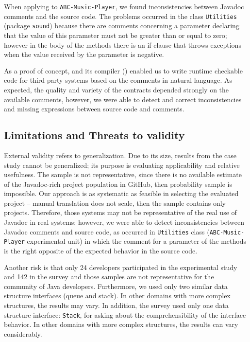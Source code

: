 When applying \contractjdoc{} to \texttt{ABC-Music-Player}, we found inconsistencies between Javadoc comments and the source code. The problems occurred in the class \texttt{Utilities} (package
\texttt{sound}) because there are comments concerning a parameter declaring that the value of
this parameter must not be greater than or equal to zero; however in the body of the methods there
is an if-clause that throws exceptions when the value received by the parameter is negative.

As a proof of concept, \contractjdoc{} and its compiler (\contractjdocCompiler{}) enabled us to write runtime
checkable code for third-party systems based on the comments in natural
language.
As expected, the quality and variety of the contracts depended strongly on the available comments, however, we were able to
detect and correct inconsistencies and missing expressions between source code and comments.




\subsection{Limitations and Threats to validity}
\label{sec:CaseStudyThreats}

External validity refers to generalization. Due to its size, results from the
case study cannot be generalized; its purpose is evaluating applicability and relative usefulness.
The sample is not representative, since there is no available estimate of the Javadoc-rich project
population in GitHub, then probability sample is impossible.
Our approach is as systematic as feasible in selecting the evaluated project -- manual translation
does not scale, then the sample contains only \totalSystems{} projects.
Therefore, those systems may not be representative of the real use of Javadoc in real systems; however, we were able
to detect inconsistencies between Javadoc comments and source code, as occurred in
\texttt{Utilities} class (\texttt{ABC-Music-Player} experimental unit) in which the comment for a
parameter of the methods is the right opposite of the expected behavior in the source code.

Another risk is that only 24 developers participated in the experimental study
and 142 in the survey and those samples are not representative for the community
of Java developers. Furthermore, we used only two similar data structure interfaces (queue and stack). In other domains with more complex structures, the results
may vary. In addition, the survey used only one data structure interface:
\texttt{Stack}, for asking about the comprehensibility of the interface behavior.
In other domains with more complex structures, the results can vary considerably.


